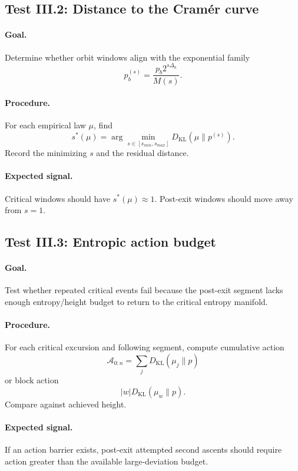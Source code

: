 \documentclass[11pt]{article}
\newcommand{\KL}{D_{\mathrm{KL}}}
\begin{document}
\subsection{Test III.2: Distance to the Cram\'er curve}

\paragraph{Goal.} Determine whether orbit windows align with the exponential family
\[
  p^{(s)}_b=\frac{p_b2^{s\Delta_b}}{M(s)}.
\]

\paragraph{Procedure.}
For each empirical law $\mu$, find
\[
  s^*(\mu)=\arg\min_{s\in[s_{min},s_{max}]}\KL(\mu\|p^{(s)}).
\]
Record the minimizing $s$ and the residual distance.

\paragraph{Expected signal.}
Critical windows should have $s^*(\mu)\approx1$. Post-exit windows should move away from $s=1$.

\subsection{Test III.3: Entropic action budget}

\paragraph{Goal.} Test whether repeated critical events fail because the post-exit segment lacks enough entropy/height budget to return to the critical entropy manifold.

\paragraph{Procedure.}
For each critical excursion and following segment, compute cumulative action
\[
  \mathcal A_{0:n}=\sum_{j}\KL(\mu_{j}\|p)
\]
or block action
\[
  |w|\KL(\mu_w\|p).
\]
Compare against achieved height.

\paragraph{Expected signal.}
If an action barrier exists, post-exit attempted second ascents should require action greater than the available large-deviation budget.
\end{document}
